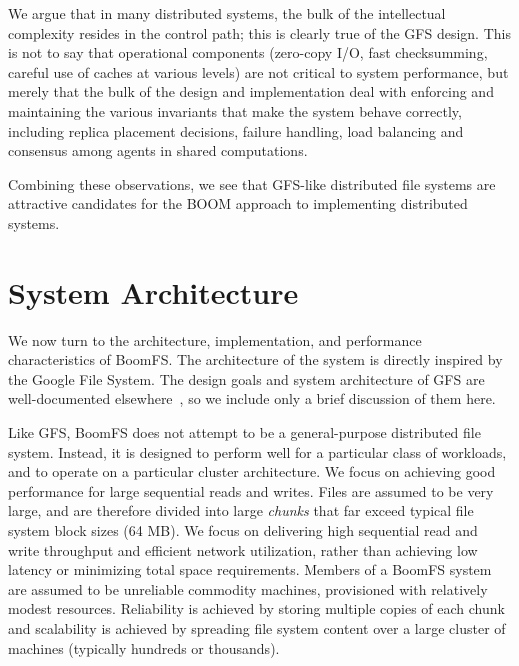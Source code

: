 \documentclass[twocolumn]{article}
\begin{document}
We argue that in many distributed systems, the bulk of the
intellectual complexity resides in the control path; this is clearly
true of the GFS design. This is not to say that operational components
(zero-copy I/O, fast checksumming, careful use of caches at various
levels) are not critical to system performance, but merely that the
bulk of the design and implementation deal with enforcing and
maintaining the various invariants that make the system behave
correctly, including replica placement decisions, failure handling,
load balancing and consensus among agents in shared computations.

Combining these observations, we see that GFS-like distributed file
systems are attractive candidates for the BOOM approach to
implementing distributed systems.

\section{System Architecture}
\label{system-arch}
We now turn to the architecture, implementation, and performance
characteristics of BoomFS. The architecture of the system is directly
inspired by the Google File System. The design goals and system
architecture of GFS are well-documented elsewhere~\cite{gfs,
  hdfs-arch}, so we include only a brief discussion of them here.

Like GFS, BoomFS does not attempt to be a general-purpose distributed
file system. Instead, it is designed to perform well for a particular
class of workloads, and to operate on a particular cluster
architecture. We focus on achieving good performance for large
sequential reads and writes. Files are assumed to be very large, and
are therefore divided into large \emph{chunks} that far exceed typical
file system block sizes (64 MB). We focus on delivering high sequential
read and write throughput and efficient network utilization, rather
than achieving low latency or minimizing total space requirements.
Members of a BoomFS system are assumed to be unreliable commodity
machines, provisioned with relatively modest resources.  Reliability
is achieved by storing multiple copies of each chunk and scalability
is achieved by spreading file system content over a large cluster of
machines (typically hundreds or thousands).
\end{document}
